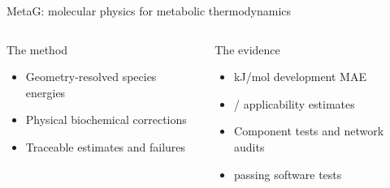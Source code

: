 \begin{frame}{MetaG: molecular physics for metabolic thermodynamics}
\begin{columns}[T]
\begin{block}{The method}
\begin{itemize}
\item Geometry-resolved species energies
\item Physical biochemical corrections
\item Traceable estimates and failures
\end{itemize}
\end{block}
\begin{block}{The evidence}
\begin{itemize}
\item \AccuracyMAE{} kJ/mol development MAE
\item \ApplicationScored{} / \ApplicationN{} applicability estimates
\item Component tests and network audits
\item \ImplementationTests{} passing software tests
\end{itemize}
\end{block}
\end{columns}
\gap{}
\end{frame}

